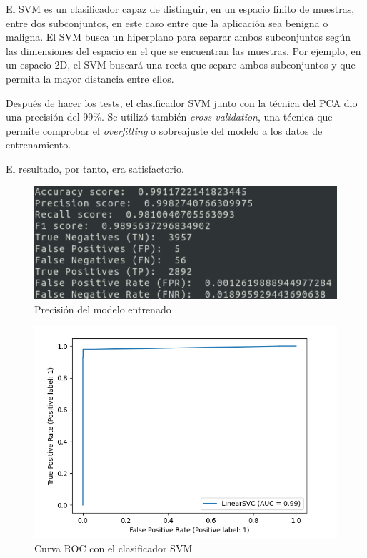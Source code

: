 El SVM es un clasificador capaz de distinguir, en un espacio finito de muestras, entre dos subconjuntos, en este caso entre que la aplicación sea benigna o maligna. El SVM busca un hiperplano para separar ambos subconjuntos según las dimensiones del espacio en el que se encuentran las muestras. Por ejemplo, en un espacio 2D, el SVM buscará una recta que separe ambos subconjuntos y que permita la mayor distancia entre ellos.

Después de hacer los tests, el clasificador SVM junto con la técnica del PCA dio una precisión del 99\%. Se utilizó también \textit{cross-validation}, una técnica que permite comprobar el \textit{overfitting} o sobreajuste del modelo a los datos de entrenamiento.

El resultado, por tanto, era satisfactorio.

\begin{figure}[H]
\centering
	\includegraphics[scale=0.8]{img/accuracy.png}
	\caption{Precisión del modelo entrenado}
\end{figure}

\begin{figure}[H]
\centering
	\includegraphics[scale=0.6]{img/roc.png}
	\caption{Curva ROC con el clasificador SVM}
\end{figure}

